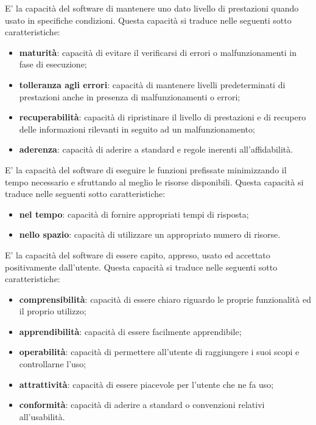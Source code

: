 	E' la capacità del software di mantenere uno dato livello di prestazioni quando usato in specifiche condizioni. Questa capacità si traduce nelle seguenti sotto caratteristiche:
	\begin{itemize}
		\item{\textbf{maturità}: capacità di evitare il verificarsi di errori o malfunzionamenti in fase di esecuzione;}
		\item{\textbf{tolleranza agli errori}: capacità di mantenere livelli predeterminati di prestazioni anche in presenza di malfunzionamenti o errori;}
		\item{\textbf{recuperabilità}: capacità di ripristinare il livello di prestazioni e di recupero delle informazioni rilevanti in seguito ad un malfunzionamento;}
		\item{\textbf{aderenza}: capacità di aderire a standard e regole inerenti all'affidabilità.}
	\end{itemize}
	
	E' la capacità del software di eseguire le funzioni prefissate minimizzando il tempo necessario e sfruttando al meglio le risorse disponibili. Questa capacità si traduce nelle seguenti sotto caratteristiche:
	\begin{itemize}
		\item{\textbf{nel tempo}: capacità di fornire appropriati tempi di risposta;}
		\item{\textbf{nello spazio}: capacità di utilizzare un appropriato numero di risorse.}
	\end{itemize}
	
	E' la capacità del software di essere capito, appreso, usato ed accettato positivamente dall'utente. Questa capacità si traduce nelle seguenti sotto caratteristiche:
	\begin{itemize}
		\item{\textbf{comprensibilità}: capacità di essere chiaro riguardo le proprie funzionalità ed il proprio utilizzo;}
		\item{\textbf{apprendibilità}: capacità di essere facilmente apprendibile;}
		\item{\textbf{operabilità}: capacità di permettere all'utente di raggiungere i suoi scopi e controllarne l'uso;}
		\item{\textbf{attrattività}: capacità di essere piacevole per l'utente che ne fa uso;}
		\item{\textbf{conformità}: capacità di aderire a standard o convenzioni relativi all'usabilità.}
	\end{itemize}

